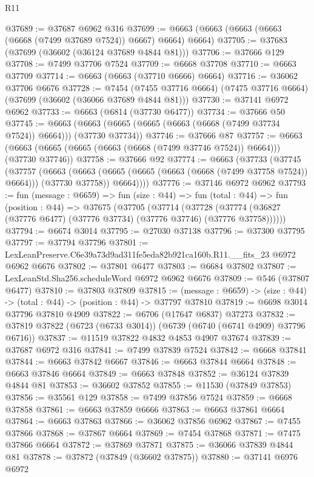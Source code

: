 \begin{lexlean}{R11}
\begin{coremodule}
@37689 := @37687 @6962 @316
@37699 := @6663 (@6663 (@6663 (@6663 (@6668 (@7499 @37689 @7524)) @6667) @6664) @6664)
@37705 := @37683 (@37699 (@36602 (@36124 @37689 @4844 @81)))
@37706 := @37666 @129
@37708 := @7499 @37706 @7524
@37709 := @6668 @37708
@37710 := @6663 @37709
@37714 := @6663 (@6663 (@37710 @6666) @6664)
@37716 := @36062 @37706 @6676
@37728 := @7454
    (@7455 @37716 @6664)
    (@7475 @37716 @6664)
    (@37699 (@36602 (@36066 @37689 @4844 @81)))
@37730 := @37141 @6972 @6962
@37733 := @6663 (@6814 (@37730 @6477))
@37734 := @37666 @50
@37745 := @6663 (@6663 (@6665 (@6665 (@6663 (@6668 (@7499 @37734 @7524)) @6664))) (@37730 @37734))
@37746 := @37666 @87
@37757 := @6663 (@6663 (@6665 (@6665 (@6663 (@6668 (@7499 @37746 @7524)) @6664))) (@37730 @37746))
@37758 := @37666 @92
@37774 := @6663
    (@37733
      (@37745
        (@37757
          (@6663
            (@6663 (@6665 (@6665 (@6663 (@6668 (@7499 @37758 @7524)) @6664))) (@37730 @37758))
            @6664))))
@37776 := @37146 @6972 @6962
@37793 := fun (message : @6659) =>
  fun (size : @44) =>
  fun (total : @44) =>
  fun (position : @44) =>
  @37675
    (@37705
      (@37714
        (@37728 (@37774 (@36827 (@37776 @6477) (@37776 @37734) (@37776 @37746) (@37776 @37758))))))
@37794 := @6674 @3014
@37795 := @27030 @37138
@37796 := @37300 @37795
@37797 := @37794 @37796
@37801 := LexLeanPreserve.C6e39a73d9ad311fe5eda82b921ca160b.R11.__fits_23 @6972 @6962 @6676
@37802 := @37801 @6477
@37803 := @6684 @37802
@37807 := LexLeanStd.Sha256.scheduleWord @6972 @6962 @6676
@37809 := @546 (@37807 @6477)
@37810 := @37803 @37809
@37815 := (message : @6659) -> (size : @44) -> (total : @44) -> (position : @44) -> @37797 @37810
@37819 := @6698 @3014 @37796 @37810 @4909
@37822 := @6706 (@17647 @6837) @37273
@37832 := @37819 @37822 (@6723 (@6733 @3014)) (@6739 (@6740 (@6741 @4909) @37796 @6716))
@37837 := @11519 @37822 @4832 @4853 @4907 @37674
@37839 := @37687 @6972 @316
@37841 := @7499 @37839 @7524
@37842 := @6668 @37841
@37844 := @6663 @37842 @6667
@37846 := @6663 @37844 @6664
@37848 := @6663 @37846 @6664
@37849 := @6663 @37848
@37852 := @36124 @37839 @4844 @81
@37853 := @36602 @37852
@37855 := @11530 (@37849 @37853)
@37856 := @35561 @129
@37858 := @7499 @37856 @7524
@37859 := @6668 @37858
@37861 := @6663 @37859 @6666
@37863 := @6663 @37861 @6664
@37864 := @6663 @37863
@37866 := @36062 @37856 @6962
@37867 := @7455 @37866
@37868 := @37867 @6664
@37869 := @7454 @37868
@37871 := @7475 @37866 @6664
@37872 := @37869 @37871
@37875 := @36066 @37839 @4844 @81
@37878 := @37872 (@37849 (@36602 @37875))
@37880 := @37141 @6976 @6972

\end{coremodule}
\end{lexlean}
